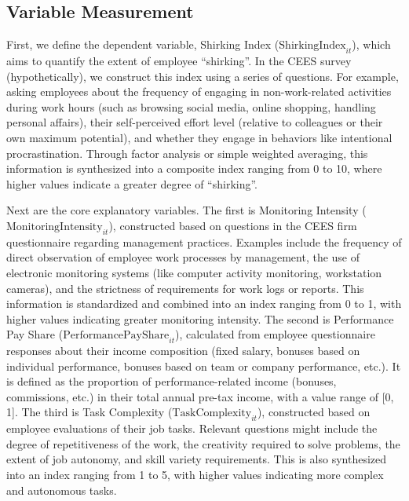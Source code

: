 \subsection{Variable Measurement}

First, we define the dependent variable, {Shirking Index (\(\text{ShirkingIndex}_{it}\))}, which aims to quantify the extent of employee \enquote{shirking}. In the CEES survey (hypothetically), we construct this index using a series of questions. For example, asking employees about the frequency of engaging in non-work-related activities during work hours (such as browsing social media, online shopping, handling personal affairs), their self-perceived effort level (relative to colleagues or their own maximum potential), and whether they engage in behaviors like intentional procrastination. Through factor analysis or simple weighted averaging, this information is synthesized into a composite index ranging from 0 to 10, where higher values indicate a greater degree of \enquote{shirking}.

Next are the core explanatory variables. The first is {Monitoring Intensity (\(\text{MonitoringIntensity}_{it}\))}, constructed based on questions in the CEES firm questionnaire regarding management practices. Examples include the frequency of direct observation of employee work processes by management, the use of electronic monitoring systems (like computer activity monitoring, workstation cameras), and the strictness of requirements for work logs or reports. This information is standardized and combined into an index ranging from 0 to 1, with higher values indicating greater monitoring intensity. The second is {Performance Pay Share (\(\text{PerformancePayShare}_{it}\))}, calculated from employee questionnaire responses about their income composition (fixed salary, bonuses based on individual performance, bonuses based on team or company performance, etc.). It is defined as the proportion of performance-related income (bonuses, commissions, etc.) in their total annual pre-tax income, with a value range of [0, 1]. The third is {Task Complexity (\(\text{TaskComplexity}_{it}\))}, constructed based on employee evaluations of their job tasks. Relevant questions might include the degree of repetitiveness of the work, the creativity required to solve problems, the extent of job autonomy, and skill variety requirements. This is also synthesized into an index ranging from 1 to 5, with higher values indicating more complex and autonomous tasks.

